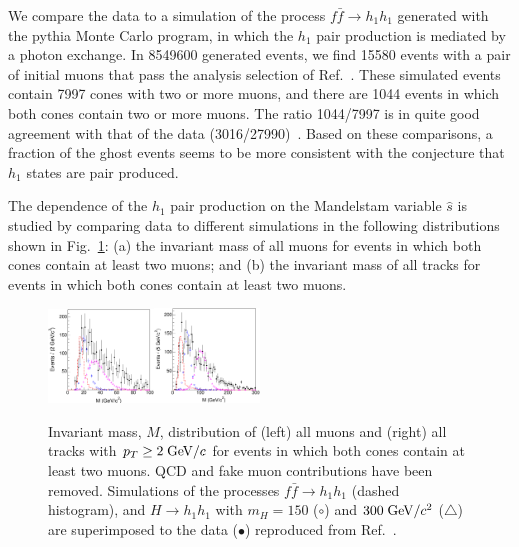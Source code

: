 \documentclass[twocolumn,10pt,prl,preprint,floatfix,nofootinbib,superscriptaddress,showpacs,amssymb]{revtex4}
\begin{document}
 We compare the data to a simulation of the process 
 $f\bar{f} \rightarrow h_1 h_1$ generated with the {\sc pythia} Monte Carlo
 program, in which the $h_1$ pair production is mediated by a photon exchange.
 In 8549600 generated events, we find 15580 events with a pair of initial
 muons that pass the analysis selection of Ref.~\cite{a0disc}. These simulated events contain 
 7997 cones with two or more muons, and there are 1044 events in which both 
 cones contain two or more muons. The ratio 1044/7997 is in quite good 
 agreement with that of the data (3016/27990)~\cite{sim1}. Based on these comparisons,
 a fraction of the ghost events seems to be more consistent with the
 conjecture that $h_1$ states are pair produced.  

 The dependence of the $h_1$ pair production on the Mandelstam variable
 $\hat{s}$ is studied by comparing data to different  simulations in the
 following distributions shown in Fig.~\ref{fig:fig_22}: (a) the invariant
 mass of all muons for events in which both cones contain at least two muons;
 and (b) the invariant mass of all tracks for events in which both cones
 contain at least two muons.
 \begin{figure}
 \begin{center}
 \vspace{-0.3in}
 \leavevmode
 \includegraphics*[width=0.25\textwidth]{fa0_22.eps}\includegraphics*[width=0.25\textwidth]{fa0_23.eps}
 \caption[]{Invariant mass, $M$, distribution of (left) all muons and (right)
            all tracks with $p_T \geq 2 \; {\rm GeV/}c$ for events in which both 
            cones contain at least two muons. QCD and fake muon contributions
            have been removed. Simulations of the processes
            $f\bar{f} \rightarrow h_1 h_1$ (dashed histogram), and
            $H \rightarrow h_1 h_1$ with $m_H=150$ ($\circ$) and $300\; {\rm GeV/}c^2$
            ($\triangle$) are superimposed to the data ($\bullet$) reproduced
            from Ref.~\cite{a0disc}.}
 \label{fig:fig_22}
 \end{center}
 \end{figure}
\end{document}
